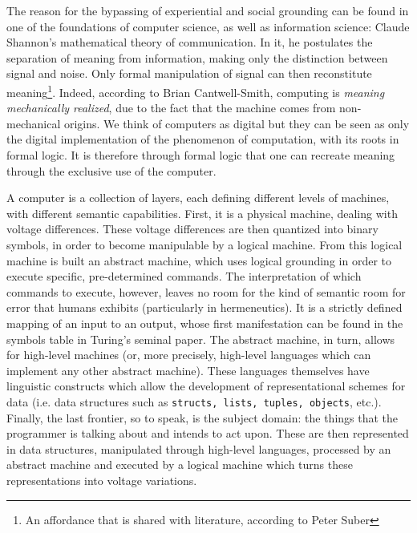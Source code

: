 The reason for the bypassing of experiential and social grounding can be found in one of the foundations of computer science, as well as information science: Claude Shannon's mathematical theory of communication. In it, he postulates the separation of meaning from information, making only the distinction between signal and noise. Only formal manipulation of signal can then reconstitute meaning\footnote{An affordance that is shared with literature, according to Peter Suber\citep{suber_what_1988}}. Indeed, according to Brian Cantwell-Smith, computing is \emph{meaning mechanically realized}, due to the fact that the machine comes from non-mechanical origins\citep{cantwell-smith_aos_2016}. We think of computers as digital but they can be seen as only the digital implementation of the phenomenon of computation, with its roots in formal logic. It is therefore through formal logic that one can recreate meaning through the exclusive use of the computer.

A computer is a collection of layers, each defining different levels of machines, with different semantic capabilities. First, it is a physical machine, dealing with voltage differences. These voltage differences are then quantized into binary symbols, in order to become manipulable by a logical machine. From this logical machine is built an abstract machine, which uses logical grounding in order to execute specific, pre-determined commands. The interpretation of which commands to execute, however, leaves no room for the kind of semantic room for error that humans exhibits (particularly in hermeneutics). It is a strictly defined mapping of an input to an output, whose first manifestation can be found in the symbols table in Turing's seminal paper. The abstract machine, in turn, allows for high-level machines (or, more precisely, high-level languages which can implement any other abstract machine). These languages themselves have linguistic constructs which allow the development of representational schemes for data (i.e. data structures such as \lstinline{structs, lists, tuples, objects}, etc.). Finally, the last frontier, so to speak, is the subject domain: the things that the programmer is talking about and intends to act upon. These are then represented in data structures, manipulated through high-level languages, processed by an abstract machine and executed by a logical machine which turns these representations into voltage variations.

